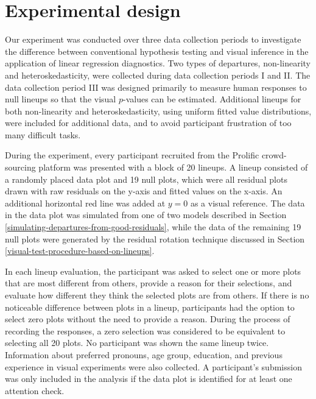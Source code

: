 \documentclass[]{interact}
\theoremstyle{plain}%
\theoremstyle{definition}
\theoremstyle{remark}
\begin{document}
\hypertarget{experimental-design}{%
\section{Experimental design}\label{experimental-design}}

Our experiment was conducted over three data collection periods to
investigate the difference between conventional hypothesis testing and
visual inference in the application of linear regression diagnostics.
Two types of departures, non-linearity and heteroskedasticity, were
collected during data collection periods I and II. The data collection
period III was designed primarily to measure human responses to null
lineups so that the visual \(p\)-values can be estimated. Additional
lineups for both non-linearity and heteroskedasticity, using uniform
fitted value distributions, were included for additional data, and to
avoid participant frustration of too many difficult tasks.

During the experiment, every participant recruited from the Prolific
crowd-sourcing platform \citep{palan2018prolific} was presented with a
block of 20 lineups. A lineup consisted of a randomly placed data plot
and 19 null plots, which were all residual plots drawn with raw
residuals on the y-axis and fitted values on the x-axis. An additional
horizontal red line was added at \(y = 0\) as a visual reference. The
data in the data plot was simulated from one of two models described in
Section \ref{simulating-departures-from-good-residuals}, while the data
of the remaining 19 null plots were generated by the residual rotation
technique discussed in Section
\ref{visual-test-procedure-based-on-lineups}.

In each lineup evaluation, the participant was asked to select one or
more plots that are most different from others, provide a reason for
their selections, and evaluate how different they think the selected
plots are from others. If there is no noticeable difference between
plots in a lineup, participants had the option to select zero plots
without the need to provide a reason. During the process of recording
the responses, a zero selection was considered to be equivalent to
selecting all 20 plots. No participant was shown the same lineup twice.
Information about preferred pronouns, age group, education, and previous
experience in visual experiments were also collected. A participant's
submission was only included in the analysis if the data plot is
identified for at least one attention check.
\end{document}
